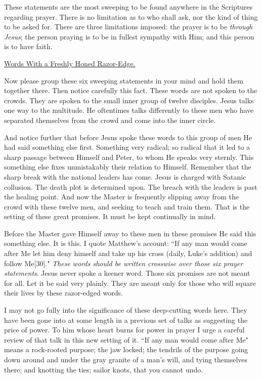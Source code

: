 These statements are the most sweeping to be found anywhere in the
Scriptures regarding prayer. There is no limitation as to who shall ask,
nor the kind of thing to be asked for. There are three limitations
imposed: the prayer is to be \textit{through Jesus}; the person praying is to be
in fullest sympathy with Him; and this person is to have faith.



\underline{Words With a Freshly Honed Razor-Edge.}


Now please group these six sweeping statements in your mind and hold them
together there. Then notice carefully this fact. These words are not
spoken to the crowds. They are spoken to the small inner group of twelve
disciples. Jesus talks one way to the multitude. He oftentimes talks
differently to these men who have separated themselves from the crowd and
come into the inner circle.

And notice further that before Jesus spoke these words to this group of
men He had said something else first. Something very radical; so radical
that it led to a sharp passage between Himself and Peter, to whom He
speaks very sternly. This something else fixes unmistakably their relation
to Himself. Remember that the sharp break with the national leaders has
come. Jesus is charged with Satanic collusion. The death plot is
determined upon. The breach with the leaders is past the healing point.
And now the Master is frequently slipping away from the crowd with these
twelve men, and seeking to teach and train them. That is the setting of
these great promises. It must be kept continually in mind.

Before the Master gave Himself away to these men in these promises He said
this something else. It is this. I quote Matthew's account: ``If any man
would come after Me let him deny himself and take up his cross (daily,
Luke's addition) and follow Me[30]." \textit{These words should be written
crosswise over those six prayer statements}. Jesus never spoke a keener
word. Those six promises are not meant for all. Let it be said very
plainly. They are meant only for those who will square their lives by
these razor-edged words.

I may not go fully into the significance of these deep-cutting words here.
They have been gone into at some length in a previous set of talks as
suggesting the price of power. To him whose heart burns for power in
prayer I urge a careful review of that talk in this new setting of it. ``If
any man would come after Me" means a rock-rooted purpose; the jaw locked;
the tendrils of the purpose going down around and under the gray granite
of a man's will, and tying themselves there; and knotting the ties; sailor
knots, that you cannot undo.


